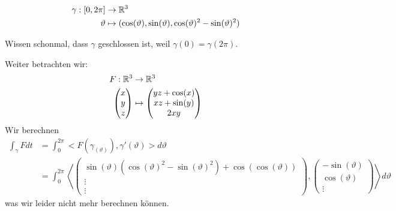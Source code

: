 \documentclass[main.tex]{subfiles}
\begin{document}
\begin{Beispiel}
  $$\begin{aligned}
    \gamma: [0,2\pi] & \to \mathbb{R}^3 \\
    \vartheta & \mapsto (\cos(\vartheta),\sin(\vartheta),\cos(\vartheta)^2 - \sin(\vartheta)^2)
  \end{aligned}$$
  \begin{center}
  \end{center}

  Wissen schonmal, dass $\gamma$ geschlossen ist, weil $\gamma(0) = \gamma(2\pi)$.

  Weiter betrachten wir:
  $$\begin{aligned}
    F: \mathbb{R}^3 & \to \mathbb{R}^3 \\
    \begin{pmatrix}
      x \\ y \\z
    \end{pmatrix} & \mapsto \begin{pmatrix}
      yz + \cos(x) \\ xz + \sin(y) \\ 2xy
    \end{pmatrix}
  \end{aligned}$$
  Wir berechnen
  $$\begin{aligned}
    \int_\gamma F dt & = \int_0^{2\pi} <F(\gamma_(\vartheta)),\gamma'(\vartheta)> d \vartheta \\
    & = \int_0^{2\pi} \left< \begin{pmatrix}
      \sin(\vartheta) (\cos(\vartheta)^2 - \sin(\vartheta)^2) + \cos(\cos(\vartheta)) \\
      \vdots \\ \vdots
    \end{pmatrix} , \begin{pmatrix}
      -\sin(\vartheta) \\ \cos(\vartheta) \\ \vdots
    \end{pmatrix} \right> d \vartheta
  \end{aligned}$$
  was wir leider nicht mehr berechnen können.


\end{Beispiel}
\end{document}
